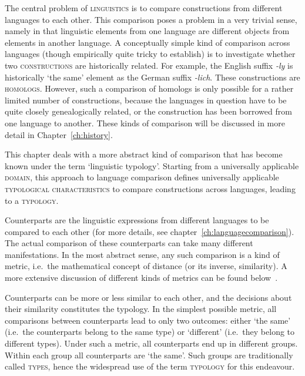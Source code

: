 \label{ch:typology}

The central problem of \textsc{linguistics} is to compare constructions from different languages to each other. This comparison poses a problem in a very trivial sense, namely in that linguistic elements from one language are different objects from elements in another language. A conceptually simple kind of comparison across languages (though empirically quite tricky to establish) is to investigate whether two \textsc{constructions} are historically related. For example, the English suffix \textit{-ly} is historically `the same' element as the German suffix \textit{-lich}. These constructions are \textsc{homologs}. However, such a comparison of homologs is only possible for a rather limited number of constructions, because the languages in question have to be quite closely genealogically related, or the construction has been borrowed from one language to another. These kinds of comparison will be discussed in more detail in Chapter~\ref{ch:history}.

This chapter deals with a more abstract kind of comparison that has become known under the term `linguistic typology'. Starting from a universally applicable \textsc{domain}, this approach to language comparison defines universally applicable \textsc{typological characteristics} to compare constructions across languages, leading to a \textsc{typology}.

%
Counterparts are the linguistic expressions from different languages to be compared to each other (for more details, see chapter~\ref{ch:languagecomparison}). The actual comparison of these counterparts can take many different manifestations. In the most abstract sense, any such comparison is a kind of metric, i.e.~the mathematical concept of distance (or its inverse, similarity). A more extensive discussion of different kinds of metrics can be found below~.

Counterparts can be more or less similar to each other, and the decisions about their similarity constitutes the typology. In the simplest possible metric, all comparisons between counterparts lead to only two outcomes: either `the same' (i.e.~the counterparts belong to the same type) or `different' (i.e.~they belong to different types). Under such a metric, all counterparts end up in different groups. Within each group all counterparts are `the same'. Such groups are traditionally called \textsc{types}, hence the widespread use of the term \textsc{typology} for this endeavour.

